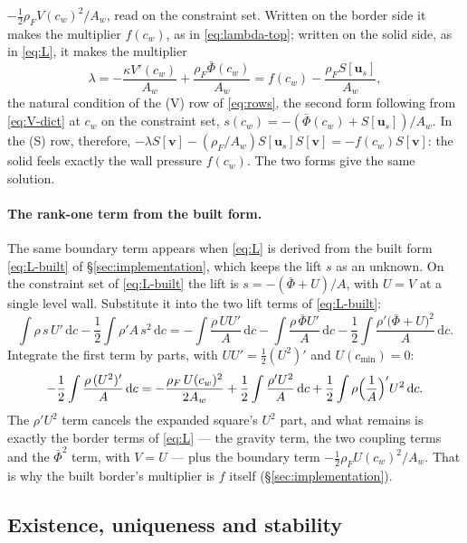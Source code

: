 \documentclass[11pt]{article}
\theoremstyle{definition}
\theoremstyle{remark}
\newcommand{\bu}{\mathbf{u}}
\newcommand{\bv}{\mathbf{v}}
\newcommand{\dc}{\,\mathrm{d}c}
\begin{document}
$-\tfrac12\rho_FV(c_w)^2/A_w$, read on the constraint set. Written on
the border side it makes the multiplier $f(c_w)$, as in
\eqref{eq:lambda-top}; written on the solid side, as in \eqref{eq:L},
it makes the multiplier
\begin{equation}
  \lambda = -\frac{\kappa V'(c_w)}{A_w} + \frac{\rho_F\bar\Phi(c_w)}{A_w}
  = f(c_w) - \frac{\rho_F S[\bu_s]}{A_w} ,
  \label{eq:lambda}
\end{equation}
the natural condition of the (V) row of \eqref{eq:rows}, the second
form following from \eqref{eq:V-dict} at $c_w$ on the constraint set,
$s(c_w) = -(\bar\Phi(c_w) + S[\bu_s])/A_w$. In the (S) row, therefore,
$-\lambda S[\bv] - (\rho_F/A_w)S[\bu_s]S[\bv] = -f(c_w)S[\bv]$: the solid
feels exactly the wall pressure $f(c_w)$. The two forms give the same
solution.

\paragraph{The rank-one term from the built form.} The same boundary
term appears when \eqref{eq:L} is derived from the built form
\eqref{eq:L-built} of \S\ref{sec:implementation}, which keeps the lift
$s$ as an unknown. On the constraint set of \eqref{eq:L-built} the lift
is $s = -(\bar\Phi + U)/A$, with $U = V$ at a single level wall.
Substitute it into the two lift terms of \eqref{eq:L-built}:
\begin{equation*}
  \int\rho\,s\,U'\dc - \frac12\int\rho' A\,s^2\dc
  = -\int\frac{\rho\,UU'}{A}\dc - \int\frac{\rho\,\bar\Phi U'}{A}\dc
    - \frac12\int\frac{\rho'\bigl(\bar\Phi + U\bigr)^2}{A}\dc .
\end{equation*}
Integrate the first term by parts, with $UU' = \tfrac12(U^2)'$ and
$U(c_{\min}) = 0$:
\begin{equation*}
  -\frac12\int\frac{\rho\,(U^2)'}{A}\dc
  = -\frac{\rho_F\,U(c_w)^2}{2A_w}
    + \frac12\int\frac{\rho' U^2}{A}\dc
    + \frac12\int\rho\Bigl(\frac1A\Bigr)'U^2\dc .
\end{equation*}
The $\rho' U^2$ term cancels the expanded square's $U^2$ part, and what
remains is exactly the border terms of \eqref{eq:L} --- the gravity
term, the two coupling terms and the $\bar\Phi^2$ term, with $V = U$ ---
plus the boundary term $-\tfrac12\rho_FU(c_w)^2/A_w$. That is why the
built border's multiplier is $f$ itself (\S\ref{sec:implementation}).

\subsection{Existence, uniqueness and stability}
\label{sec:uniqueness}
\label{sec:settled}
\end{document}
